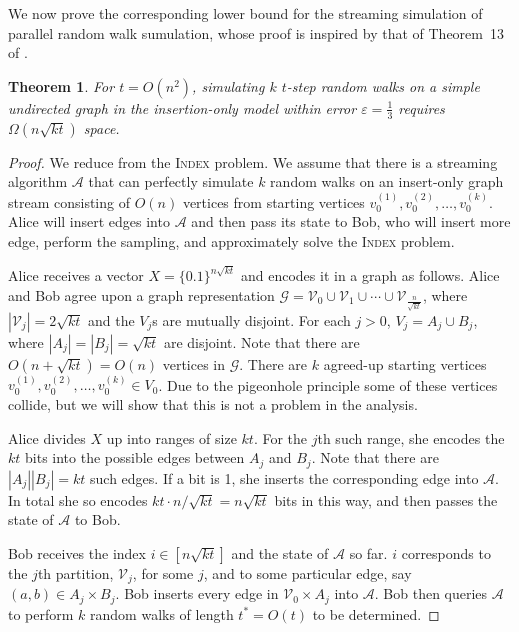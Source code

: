 \documentclass[10]{report}
\newtheorem{theorem}{Theorem}[section]
\newcommand{\algoname}[1]{\textnormal{\textsc{#1}}}
\begin{document}
We now prove the corresponding lower bound for the streaming simulation of parallel random walk sumulation, whose proof is inspired by that of Theorem~13 of \cite{jin2018simulating}.
%
\begin{theorem} \label{thm:rw:lower}
For $t = O(n^2)$, simulating $k$ $t$-step random walks on a simple undirected graph in the insertion-only model within error $\varepsilon = \frac{1}{3}$ requires $\Omega(n\sqrt{kt})$ space.
\end{theorem}
%
\begin{proof}
We reduce from the \algoname{Index} problem.
We assume that there is a streaming algorithm $\mathcal{A}$ that can perfectly simulate $k$ random walks on an insert-only graph stream
consisting of $O(n)$ vertices from starting vertices $v_0^{(1)}, v_0^{(2)}, \dots, v_0^{(k)}$.
Alice will insert edges into $\mathcal{A}$ and then pass its state to Bob, who will insert more edge, perform the sampling, and approximately solve the \algoname{Index} problem.

Alice receives a vector $X = \{0.1\}^{n\sqrt{kt}}$ and encodes it in a graph as follows.
Alice and Bob agree upon a graph representation $\mathcal{G} = \mathcal{V}_0 \cup \mathcal{V}_1 \cup \cdots \cup \mathcal{V}_{\frac{n}{\sqrt{kt}}}$, where $|\mathcal{V}_j| = 2 \sqrt{kt}$ and the $V_j$s are mutually disjoint.
For each $j >0$, $V_j = A_j \cup B_j$, where $|A_j| = |B_j| = \sqrt{kt}$ are disjoint.
Note that there are $O(n + \sqrt{kt}) = O(n)$ vertices in $\mathcal{G}$.
There are $k$ agreed-up starting vertices $v_0^{(1)}, v_0^{(2)}, \dots, v_0^{(k)} \in V_0$.
Due to the pigeonhole principle some of these vertices collide, but we will show that this is not a problem in the analysis.

Alice divides $X$ up into ranges of size $kt$.
For the $j$th such range, she encodes the $kt$ bits into the possible edges between $A_j$ and $B_j$.
Note that there are $|A_j||B_j| = kt$ such edges.
If a bit is 1, she inserts the corresponding edge into $\mathcal{A}$. 
In total she so encodes $kt \cdot n/\sqrt{kt} = n\sqrt{kt}$ bits in this way, and then passes the state of $\mathcal{A}$ to Bob. 

Bob receives the index $i \in [n\sqrt{kt}]$ and the state of $\mathcal{A}$ so far.
$i$ corresponds to the $j$th partition, $\mathcal{V}_j$, for some $j$, and to some particular edge, say $(a,b) \in A_j \times B_j$.
Bob inserts every edge in $\mathcal{V}_0 \times A_j$ into $\mathcal{A}$.
Bob then queries $\mathcal{A}$ to perform $k$ random walks of length $t^* = O(t)$ to be determined.


\end{proof}
\end{document}
